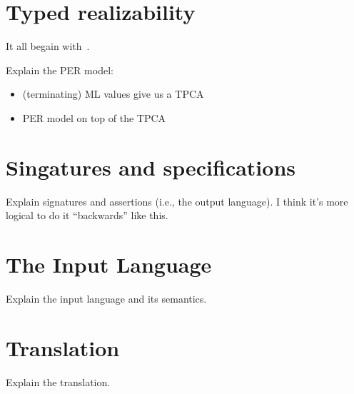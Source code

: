 \section{Typed realizability}
\label{sec:typed-realizability}

It all begain with~\cite{KleeneSC:intint}.

Explain the PER model:
\begin{itemize}
\item (terminating) ML values give us a TPCA
\item PER model on top of the TPCA
\end{itemize}


\section{Singatures and specifications}
\label{sec:sing-spec}

Explain signatures and assertions (i.e., the output language). I think
it's more logical to do it ``backwards'' like this.

\section{The Input Language}
\label{sec:input-language}

Explain the input language and its semantics.

\section{Translation}
\label{sec:translation}

Explain the translation.




